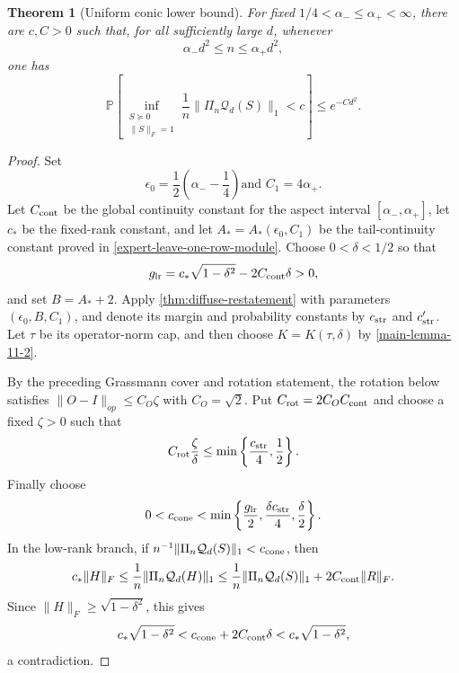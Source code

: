\documentclass[11pt]{article}
\numberwithin{equation}{section}
\newtheorem{theorem}{Theorem}[section]
\theoremstyle{definition}
\theoremstyle{remark}
\newcommand{\Pp}{\mathbb P}
\newcommand{\1}{\boldsymbol 1}
\newcommand{\PiZero}{\Pi_n}
\begin{document}
\begin{aiblock}
\begin{theorem}[Uniform conic lower
  bound]\label{main-theorem-11-3}
  For fixed $1/4<\alpha_-\le\alpha_+<\infty$, there are
  $c,C>0$ such that, for all sufficiently large $d$,
  whenever
  \[
    \alpha_-d^2\le n\le\alpha_+d^2,
  \]
  one has
  \[
    \Pp\left[ \inf_{\substack{S\succeq0\\\|S\|_F=1}}
    \frac1n\|\PiZero\mathcal{Q}_d(S)\|_1<c \right]\le
    e^{-Cd^2}.
  \]
\end{theorem}

\begin{proof}
  Set
  \[
    \epsilon_0=\frac12\left(\alpha_--\frac14\right)\text{
    and }C_1=4\alpha_+.
  \]
  Let $C_{\rm cont}$ be the global continuity constant for
  the aspect interval $[\alpha_-,\alpha_+]$, let $c_*$ be
  the fixed-rank constant, and let $A_*=A_*(\epsilon_0,C_1)$
  be the tail-continuity constant proved in
  \cref{expert-leave-one-row-module}. Choose
  $0<\delta<1/2$ so that
  \[
    g_{\rm lr}=c_*\sqrt{1-\delta^2}-2C_{\rm cont}\delta>0,
  \]
  and set $B=A_*+2$. Apply \cref{thm:diffuse-restatement}
  with parameters $(\epsilon_0,B,C_1)$, and denote its
  margin and probability constants by $c_{\rm str}$ and
  $c'_{\rm str}$. Let $\tau$ be its operator-norm cap, and
  then choose $K=K(\tau,\delta)$ by
  \cref{main-lemma-11-2}.

  By the preceding Grassmann cover and rotation statement,
  the rotation below satisfies $\|O-I\|_{op}\le C_O\zeta$
  with $C_O=\sqrt2$. Put $C_{\rm rot}=2C_OC_{\rm cont}$
  and choose a fixed $\zeta>0$ such that
  \[
    C_{\rm rot}\frac\zeta\delta\le\min\left\{
    \frac{c_{\rm str}}4,\frac12\right\}.
  \]
  Finally choose
  \[
    0<c_{\rm cone}<\min\left\{\frac{g_{\rm lr}}2,
    \frac{\delta c_{\rm str}}4,\frac\delta2\right\}.
  \]
  In the low-rank branch, if $n^{-1}\|\PiZero\mathcal{Q}_d
  (S)\|_1<c_{\rm cone}$, then
  \[
    c_*\|H\|_F \le\frac1n\|\PiZero\mathcal{Q}_d(H)\|_1
    \le\frac1n\|\PiZero\mathcal{Q}_d(S)\|_1+2C_{\rm cont}
    \|R\|_F.
  \]
  Since $\|H\|_F\ge\sqrt{1-\delta^2}$, this gives
  \[
    c_*\sqrt{1-\delta^2}<c_{\rm cone}+2C_{\rm cont}\delta<
    c_*\sqrt{1-\delta^2},
  \]
  a contradiction.


\end{proof}
\end{aiblock}
\end{document}
